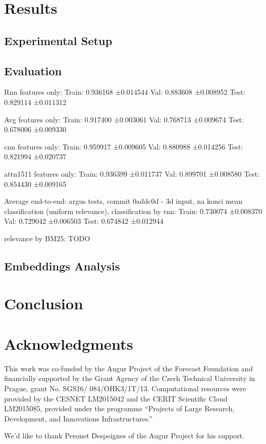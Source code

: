 \documentclass[11pt]{article}
\begin{document}
\section{Results}
\label{sec:res}

\subsection{Experimental Setup}

\subsection{Evaluation}

Rnn features only:
Train: 0.936168 ±0.014544
Val: 0.883608 ±0.008952
Test: 0.829114 ±0.011312

Avg features only:
Train: 0.917400 ±0.003061
Val: 0.768713 ±0.009674
Test: 0.678006 ±0.009330

cnn features only:
Train: 0.959917 ±0.009605
Val: 0.880988 ±0.014256
Test: 0.821994 ±0.020737

attn1511 features only:
Train: 0.936399 ±0.011737
Val: 0.899701 ±0.008580
Test: 0.854430 ±0.009165

Average end-to-end: argus tests, commit 0addc0d - 3d input, na konci mean
classification (uniform relevance), classification by rnn:
Train: 0.730074 ±0.008370
Val: 0.729042 ±0.006503
Test: 0.674842 ±0.012944

relevance by BM25:
TODO

\subsection{Embeddings Analysis}

\section{Conclusion}
\label{sec:concl}


\section*{Acknowledgments}
{\footnotesize
	This work was co-funded by the Augur Project of the Forecast Foundation
and financially supported by the Grant Agency of the Czech Technical
University in Prague, grant No. SGS16/ 084/OHK3/1T/13.
Computational resources were provided by the CESNET LM2015042 and the CERIT Scientific Cloud LM2015085,
provided under the programme ``Projects of Large Research, Development, and Innovations Infrastructures.''

We'd like to thank Peronet Despeignes of the Augur Project for his support.}



\end{document}
